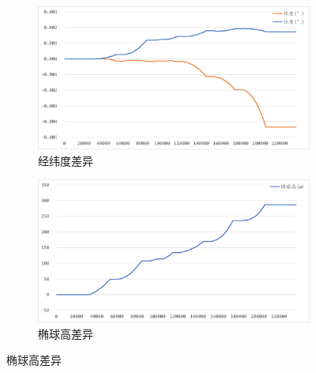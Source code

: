 \documentclass[10pt,a4paper]{ctexart}
\begin{document}
\begin{figure}[H]
{        \begin{subfigure}{0.49\textwidth}
            \centering
            \includegraphics[width=\linewidth]{Figures/DataFigure/灵素修正经纬度差异.png}
            \caption*{经纬度差异}
        \end{subfigure}\hfill
        \begin{subfigure}{0.49\textwidth}
            \centering
            \includegraphics[width=\linewidth]{Figures/DataFigure/灵素修正高程差异.png}
            \caption*{椭球高差异}
        \end{subfigure}

}
\end{figure}
\end{document}
